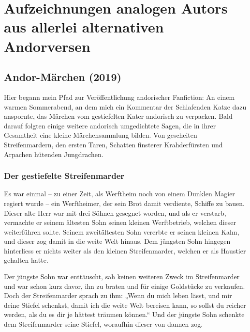 \documentclass[10pt, a4paper, oneside]{book}
\begin{document}









\part{Aufzeichnungen analogen Autors aus allerlei alternativen Andorversen}


\begin{chapterbox}
    \chapter{Andor-Märchen (2019)}

    Hier begann mein Pfad zur Veröffentlichung andorischer Fanfiction: An einem warmen Sommerabend, an dem mich ein Kommentar der Schlafenden Katze dazu anspornte, das Märchen vom gestiefelten Kater andorisch zu verpacken. Bald darauf folgten einige weitere andorisch umgedichtete Sagen, die in ihrer Gesamtheit eine kleine Märchensammlung bilden. Von gescheiten Streifenmardern, den ersten Taren, Schatten finsterer Krahderfürsten und Arpachen hütenden Jungdrachen.
\end{chapterbox}

\extramarks{}{ }

\section{Der gestiefelte Streifenmarder}


Es war einmal – zu einer Zeit, als Werftheim noch von einem Dunklen Magier regiert wurde – ein Werftheimer, der sein Brot damit verdiente, Schiffe zu bauen. Dieser alte Herr war mit drei Söhnen gesegnet worden, und als er verstarb, vermachte er seinem ältesten Sohn seinen kleinen Werftbetrieb, welchen dieser weiterführen sollte. Seinem zweitältesten Sohn vererbte er seinen kleinen Kahn, und dieser zog damit in die weite Welt hinaus. Dem jüngsten Sohn hingegen hinterliess er nichts weiter als den kleinen Streifenmarder, welchen er als Haustier gehalten hatte.

Der jüngste Sohn war enttäuscht, sah keinen weiteren Zweck im Streifenmarder und war schon kurz davor, ihn zu braten und für einige Goldstücke zu verkaufen. Doch der Streifenmarder sprach zu ihm: „Wenn du mich leben lässt, und mir deine Stiefel schenkst, damit ich die weite Welt bereisen kann, so sollst du reicher werden, als du es dir je hättest träumen können.“ Und der jüngste Sohn schenkte dem Streifenmarder seine Stiefel, woraufhin dieser von dannen zog.
\end{document}

